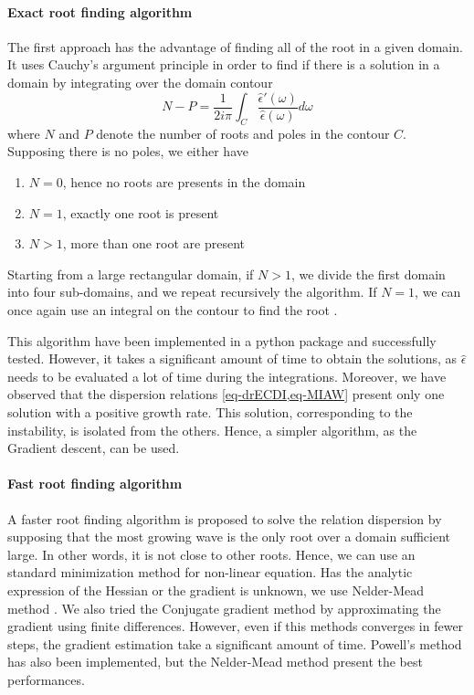   \paragraph{Exact root finding algorithm\\}
    The first approach has the advantage of finding all of the root in a given domain.
    It uses Cauchy's argument principle in order to find if there is a solution in a domain by integrating over the domain contour
    \begin{equation} \label{eq-rootnumber}
      N - P = \frac{1}{2 i \pi} \int_{C} \frac{\hat\epsilon'(\omega)}{\hat\epsilon(\omega)} d\omega
    \end{equation}
    where $N$ and $P$ denote the number of roots and poles in the contour $C$.
    Supposing there is no poles, we either have
    \begin{enumerate}
      \item $N=0$, hence no roots are presents in the domain
      \item $N=1$, exactly one root is present
      \item $N>1$, more than one root are present
    \end{enumerate}

    Starting from a large rectangular domain, if $N>1$, we divide the first domain into four sub-domains, and we repeat recursively the algorithm.
    If $N=1$, we can once again use an integral on the contour to find the root \citep{fortune2001}.
    
    \vspace{1em}
    This algorithm have been implemented in a python package and successfully tested.
    However, it takes a significant amount of time to obtain the solutions, as $\hat\epsilon$ needs to be evaluated a lot of time during the integrations.
    Moreover, we have observed that the dispersion relations \cref{eq-drECDI,eq-MIAW} present only one solution with a positive growth rate.
    This solution, corresponding to the instability, is isolated from the others.
    Hence, a simpler algorithm, as the Gradient descent, can be used.
    
  \paragraph{Fast root finding algorithm\\}
    A faster root finding algorithm is proposed to solve the relation dispersion by supposing that the most growing wave is the only root over a domain sufficient large.
    In other words, it is not close to other roots.
    Hence, we can use an standard minimization method for non-linear equation.
    Has the analytic expression of the Hessian or the gradient is unknown, we use Nelder-Mead method \citep{mckinnon1998}.
    We also tried the Conjugate gradient method by approximating the gradient using finite differences. 
    However, even if this methods converges in fewer steps, the gradient estimation take a significant amount of time.
    Powell's method \citet{powell1964} has also been implemented, but the Nelder-Mead method present the best performances.
    
